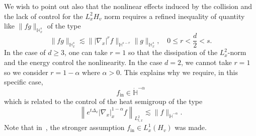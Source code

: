 \documentclass[AHL,Unicode,longabstracts,published]{cedram}
\newcommand{\ini}{\mathrm{in}}
\newcommand{\bbH}{\mathbb{H}}
\newcommand{\Ss}{H}
\renewcommand*\le{\leqslant}
\renewcommand*\ge{\geqslant}
\begin{document}
We wish to point out also that the nonlinear effects induced by the collision and the lack of control for the $L^2_{x}\Ss_v$ norm requires a refined inequality of quantity like $\| f g \|_{\bbH^s_x}$ of the type
\[
\| f g \|_{\bbH^s_x} \lesssim \| | \nabla_x |^{r} f \|_{\bbH^{s - r}} \| g \|_{\bbH^s_x}, \quad {0 \le r < \frac{d}{2} < s}.
\]
In the case of $d \ge 3$, one can take $r = 1$ so that the dissipation of the $L^2_x$-norm and the energy control the nonlinearity. In the case $d = 2$, we cannot take $r= 1$ so we consider $r = 1-\alpha$ where $\alpha > 0$. This explains why we require, in this specific case,
\[
f_\ini \in \dot{\bbH}^{-\alpha}
\]
which is related to the control of the heat semigroup of the type
\[
\left\| e^{t \Delta_x}| \nabla_x|^{1-\alpha}_x f \right\|_{L^2_{t, x}} \lesssim \| f \|_{ \dot{\bbH}^{-\alpha} }.
\]
Note that in~\cite{G2023,GT2020}, the stronger assumption $f_\ini \in L^1_x (\Ss_v)$ was made.
\end{document}
